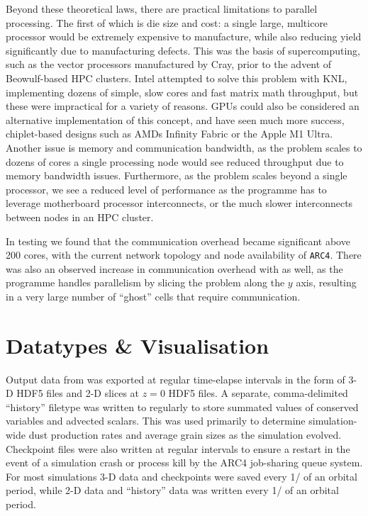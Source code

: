 Beyond these theoretical laws, there are practical limitations to parallel processing.
The first of which is die size and cost: a single large, multicore processor would be extremely expensive to manufacture, while also reducing yield significantly due to manufacturing defects.
This was the basis of supercomputing, such as the vector processors manufactured by Cray, prior to the advent of Beowulf-based HPC clusters.
Intel attempted to solve this problem with KNL, implementing dozens of simple, slow cores and fast matrix math throughput, but these were impractical for a variety of reasons.
GPUs could also be considered an alternative implementation of this concept, and have seen much more success, chiplet-based designs such as AMDs Infinity Fabric or the Apple M1 Ultra.
Another issue is memory and communication bandwidth, as the problem scales to dozens of cores a single processing node would see reduced throughput due to memory bandwidth issues.
Furthermore, as the problem scales beyond a single processor, we see a reduced level of performance as the programme has to leverage motherboard processor interconnects, or the much slower interconnects between nodes in an HPC cluster.

In testing \athena{} we found that the communication overhead became significant above 200 cores, with the current network topology and node availability of \texttt{ARC4}.
There was also an observed increase in communication overhead with \mg{} as well, as the programme handles parallelism by slicing the problem along the $y$ axis, resulting in a very large number of ``ghost'' cells that require communication.


\section{Datatypes \& Visualisation}
\label{sec:visualisation}

Output data from \athena{} was exported at regular time-elapse intervals in the form of 3-D HDF5 files \parencite{hdf5} and 2-D slices at $z=0$ HDF5 files.
A separate, comma-delimited ``history'' filetype was written to regularly to store summated values of conserved variables and advected scalars.
This was used primarily to determine simulation-wide dust production rates and average grain sizes as the simulation evolved.
Checkpoint files were also written at regular intervals to ensure a restart in the event of a simulation crash or process kill by the ARC4 job-sharing queue system.
For most simulations 3-D data and checkpoints were saved every 1/ of an orbital period, while 2-D data and ``history'' data was written every 1/ of an orbital period.

